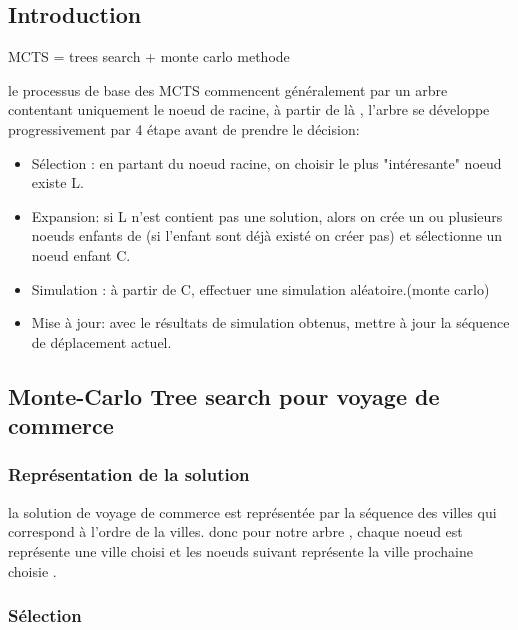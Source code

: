 \documentclass[]{article}
\date{}
\begin{document}
\hypertarget{introduction-1}{%
\subsection{Introduction}\label{introduction-1}}

MCTS = trees search + monte carlo methode

le processus de base des MCTS commencent généralement par un arbre
contentant uniquement le noeud de racine, à partir de là , l'arbre se
développe progressivement par 4 étape avant de prendre le décision:

\begin{itemize}
\item
  Sélection : en partant du noeud racine, on choisir le plus
  "intéresante" noeud existe L.
\item
  Expansion: si L n'est contient pas une solution, alors on crée un ou
  plusieurs noeuds enfants de (si l'enfant sont déjà existé on créer
  pas) et sélectionne un noeud enfant C.
\item
  Simulation : à partir de C, effectuer une simulation aléatoire.(monte
  carlo)
\item
  Mise à jour: avec le résultats de simulation obtenus, mettre à jour la
  séquence de déplacement actuel.
\end{itemize}

\hypertarget{monte-carlo-tree-search-pour-voyage-de-commerce}{%
\subsection{Monte-Carlo Tree search pour voyage de
commerce}\label{monte-carlo-tree-search-pour-voyage-de-commerce}}

\hypertarget{repruxe9sentation-de-la-solution}{%
\subsubsection{Représentation de la
solution}\label{repruxe9sentation-de-la-solution}}

la solution de voyage de commerce est représentée par la séquence des
villes qui correspond à l'ordre de la villes. donc pour notre arbre ,
chaque noeud est représente une ville choisi et les noeuds suivant
représente la ville prochaine choisie .

\hypertarget{suxe9lection}{%
\subsubsection{Sélection }\label{suxe9lection}}
\end{document}
